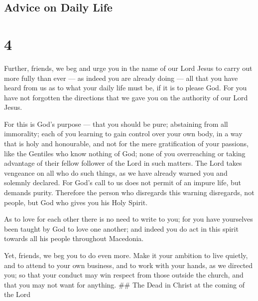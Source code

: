 \hypertarget{advice-on-daily-life}{%
\subsection{Advice on Daily Life}\label{advice-on-daily-life}}

\hypertarget{section-3}{%
\section{4}\label{section-3}}

 Further, friends, we beg and urge you in the name of our
Lord Jesus to carry out more fully than ever --- as indeed you are
already doing --- all that you have heard from us as to what your daily
life must be, if it is to please God.  For you have not
forgotten the directions that we gave you on the authority of our Lord
Jesus.

 For this is God's purpose --- that you should be pure;
abstaining from all immorality;  each of you learning to
gain control over your own body, in a way that is holy and honourable,
 and not for the mere gratification of your passions, like
the Gentiles who know nothing of God;  none of you
overreaching or taking advantage of their fellow follower of the Lord in
such matters. The Lord takes vengeance on all who do such things, as we
have already warned you and solemnly declared.  For God's
call to us does not permit of an impure life, but demands purity.
 Therefore the person who disregards this warning
disregards, not people, but God who gives you his Holy Spirit.

 As to love for each other there is no need to write to you;
for you have yourselves been taught by God to love one another;
 and indeed you do act in this spirit towards all his
people throughout Macedonia.

Yet, friends, we beg you to do even more.  Make it your
ambition to live quietly, and to attend to your own business, and to
work with your hands, as we directed you;  so that your
conduct may win respect from those outside the church, and that you may
not want for anything. \#\# The Dead in Christ at the coming of the Lord

